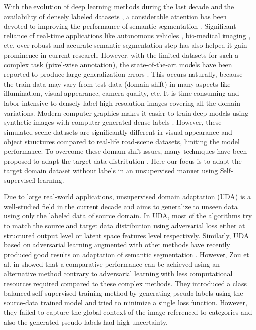 \documentclass[10pt,twocolumn,letterpaper]{article}
\begin{document}
With the evolution of deep learning methods during the last decade and the availability of densely labeled datasets \cite{Cordts2016Cityscapes, Ros_2016_CVPR, Richter_2016_ECCV}, a considerable attention has been devoted to improving the performance of semantic segmentation \cite{long2015fully, badrinarayanan2015segnet, chen2014semantic, noh2015learning, chen2018deeplab, zhao2017pyramid, csurka2008simple}. 
Significant reliance of real-time applications like autonomous vehicles \cite{kitty2012we}, bio-medical imaging \cite{ronneberger2015unet}, etc. over robust and accurate semantic segmentation step has also helped it gain prominence in current research. 
However, with the limited datasets for such a complex task (pixel-wise annotation), the state-of-the-art models have been reported to produce large generalization errors \cite{zou2018unsupervised, vu2019advent}.
This occurs naturally, because the train data may vary from test data (domain shift) in many aspects like illumination, visual appearance, camera quality, etc. 
It is time consuming and labor-intensive to densely label high resolution images covering all the domain variations. Modern computer graphics makes it easier to train deep models using synthetic images with computer generated dense labels \cite{Richter_2016_ECCV, Ros_2016_CVPR}. However, these simulated-scene datasets are significantly different in visual appearance and object structures compared to real-life road-scene datasets, limiting the model performance. 
To overcome these domain shift issues, many techniques have been proposed to adapt the target data distribution \cite{hoffman2016fcns, hoffman2017cycada, tsai2018learning}. Here our focus is to adapt the target domain dataset without labels in an unsupervised manner using Self-supervised learning.  

Due to large real-world applications, unsupervised domain adaptation (UDA) is a well-studied field in the current decade and aims to generalize to unseen data using only the labeled data of source domain.  
In UDA, most of the algorithms try to match the source and target data distribution using adversarial loss \cite{goodfellow2014generative} either at structured output level \cite{tsai2018learning} or latent space features level \cite{chen2017no, mancini2018boosting, chen2017road} respectively. Similarly, UDA based on adversarial learning augmented with other methods have recently produced good results on adaptation of semantic segmentation \cite{vu2019advent, zhang2018fully}. 
However, Zou et al. in \cite{zou2018unsupervised} showed that a comparative performance can be achieved using an alternative method contrary to adversarial learning with less computational resources required compared to these complex methods. They introduced a class balanced self-supervised training method by generating pseudo-labels using the source-data trained model and tried to minimize a single loss function. However, they failed to capture the global context of the image referenced to categories and also the generated pseudo-labels had high uncertainty.
 
\end{document}
